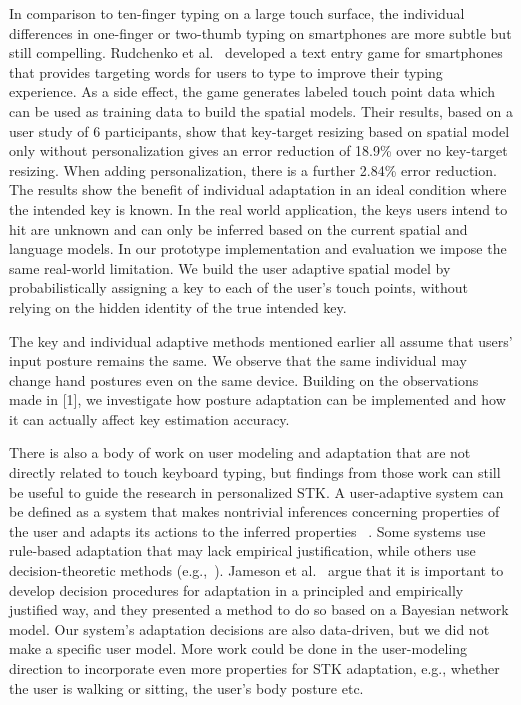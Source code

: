 \documentclass{sigchi}
\begin{document}
In comparison to ten-finger typing on a large touch surface, the individual 
differences in one-finger or two-thumb typing on smartphones are more subtle but
still compelling. Rudchenko et al.~\cite{Rudchenko:2011} developed a text entry 
game for smartphones that provides targeting words for users to type to improve 
their typing experience. As a side effect, the game generates labeled touch 
point data which can be used as training data to build the spatial models.
Their results, based on a user study of 6 participants, show that key-target
resizing based on spatial model only without personalization gives an error reduction of 18.9\% over no key-target resizing. 
When adding personalization, there is a further 2.84\% error reduction.
The results show the benefit of individual adaptation in an ideal condition
where the intended key is known. In the real world application, the keys users 
intend to hit are unknown and can only be inferred based on the current spatial 
and language models. In our prototype implementation and evaluation we impose 
the same real-world limitation. We build the user adaptive spatial model by 
probabilistically assigning a key to each of the user's touch points, without
relying on the hidden identity of the true intended key.

The key and individual adaptive methods mentioned earlier all assume that users' input posture
remains the same. We observe that the same individual may change hand postures even on the same device. Building on the observations made in [1], we investigate how posture adaptation can be implemented and how it can actually affect key estimation accuracy.

There is also a body of work on user modeling and adaptation that are not
directly related to touch keyboard typing, but findings from those work can
still be useful to guide the research in personalized STK. A
user-adaptive system can be defined as a system that makes
nontrivial inferences concerning properties of the user and adapts its actions
to the inferred properties ~\cite{Jameson:2000}. Some systems use rule-based
adaptation that may lack empirical justification, while others use 
decision-theoretic methods (e.g.,~\cite{Jameson:1998}). Jameson et al.~\cite{Jameson:2000} argue that it is important to develop decision procedures for adaptation in a principled and
empirically justified way, and they presented a method to do so based on a
Bayesian network model. Our system's adaptation decisions are also data-driven,
but we did not make a specific user model. More work could be done in the
user-modeling direction to incorporate even more properties for
STK adaptation, e.g., whether the user is walking or sitting, the user's body
posture etc.
\end{document}
